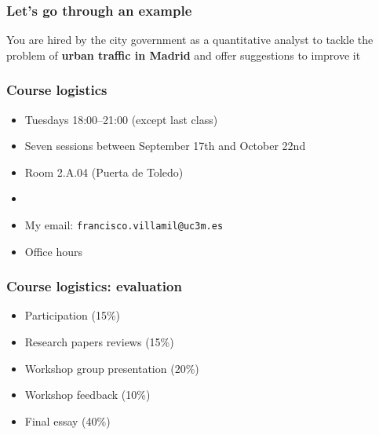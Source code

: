 \documentclass[aspectratio=43]{beamer}
\begin{document}
\begin{frame}
\frametitle{Let's go through an example}
\centering

You are hired by the city government as a quantitative analyst to tackle the problem of \textbf{urban traffic in Madrid} and offer suggestions to improve it

\end{frame}

\begin{frame}
\frametitle{Course logistics}
\centering

\begin{itemize}
  \item Tuesdays 18:00--21:00 (except last class)
  \item Seven sessions between September 17th and October 22nd
  \item Room 2.A.04 (Puerta de Toledo)
  \item[]
  \item My email: \texttt{francisco.villamil@uc3m.es}
  \item Office hours
\end{itemize}

\end{frame}

\begin{frame}
\frametitle{Course logistics: evaluation}
\centering

\begin{itemize}
  \item Participation (15\%)
  \item Research papers reviews (15\%)
  \item Workshop group presentation (20\%)
  \item Workshop feedback (10\%)
  \item Final essay (40\%)
\end{itemize}

\end{frame}
\end{document}
